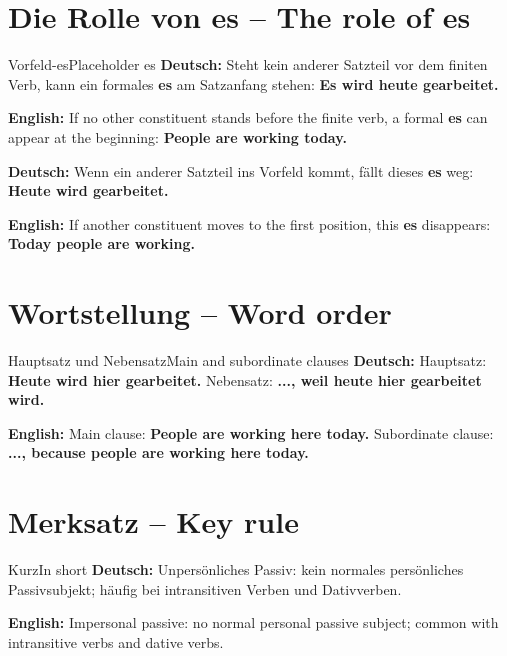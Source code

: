 \documentclass[a4paper,11pt]{article}
\newcommand{\GermanText}[1]{\textbf{Deutsch: }#1\par}
\newcommand{\EnglishText}[1]{{\small\color{SoftGray}\textbf{English: }#1\par}}
\begin{document}
\section{Die Rolle von es -- The role of es}
\begin{grammarentry}{Vorfeld-es}{Placeholder es}
\GermanText{Steht kein anderer Satzteil vor dem finiten Verb, kann ein formales \textbf{es} am Satzanfang stehen: \textbf{Es wird heute gearbeitet.}}
\EnglishText{If no other constituent stands before the finite verb, a formal \textbf{es} can appear at the beginning: \textbf{People are working today.}}
\GermanText{Wenn ein anderer Satzteil ins Vorfeld kommt, fällt dieses \textbf{es} weg: \textbf{Heute wird gearbeitet.}}
\EnglishText{If another constituent moves to the first position, this \textbf{es} disappears: \textbf{Today people are working.}}
\end{grammarentry}

\section{Wortstellung -- Word order}
\begin{grammarentry}{Hauptsatz und Nebensatz}{Main and subordinate clauses}
\GermanText{Hauptsatz: \textbf{Heute wird hier gearbeitet.} Nebensatz: \textbf{..., weil heute hier gearbeitet wird.}}
\EnglishText{Main clause: \textbf{People are working here today.} Subordinate clause: \textbf{..., because people are working here today.}}
\end{grammarentry}

\section{Merksatz -- Key rule}
\begin{grammarentry}{Kurz}{In short}
\GermanText{Unpersönliches Passiv: kein normales persönliches Passivsubjekt; häufig bei intransitiven Verben und Dativverben.}
\EnglishText{Impersonal passive: no normal personal passive subject; common with intransitive verbs and dative verbs.}
\end{grammarentry}
\end{document}
